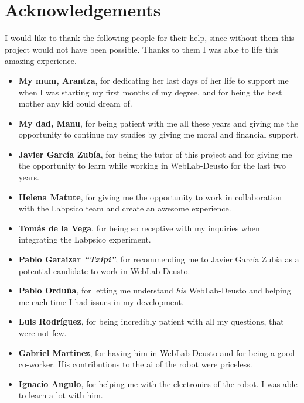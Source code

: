 \chapter*{Acknowledgements}

I would like to thank the following people for their help, since without them this project would not
have been possible. Thanks to them I was able to life this amazing experience.

\begin{itemize}
	\item \textbf{My mum, Arantza}, for dedicating her last days of her life to support me when I
	was starting my first months of my degree, and for being the best mother any kid could dream of.

	\item \textbf{My dad, Manu}, for being patient with me all these years and giving me the
	opportunity to continue my studies by giving me moral and financial support.

	\item \textbf{Javier García Zubía}, for being the tutor of this project and for giving me the
	opportunity to learn while working in WebLab-Deusto for the last two years.

	\item \textbf{Helena Matute}, for giving me the opportunity to work in collaboration with the
	Labpsico team and create an awesome experience.

	\item \textbf{Tomás de la Vega}, for being so receptive with my inquiries when integrating the
	Labpsico experiment.

	\item \textbf{Pablo Garaizar \emph{``Txipi''}}, for recommending me to Javier García Zubía as a
	potential candidate to work in WebLab-Deusto.

	\item \textbf{Pablo Orduña}, for letting me understand \emph{his} WebLab-Deusto and helping me
	each time I had issues in my development.

	\item \textbf{Luis Rodríguez}, for being incredibly patient with all my questions, that were not
	few.

	\item \textbf{Gabriel Martinez}, for having him in WebLab-Deusto and for being a good co-worker.
	His contributions to the \acrshort{ai} of the robot were priceless.

	\item \textbf{Ignacio Angulo}, for helping me with the electronics of the robot. I was able to
	learn a lot with him.
\end{itemize}

